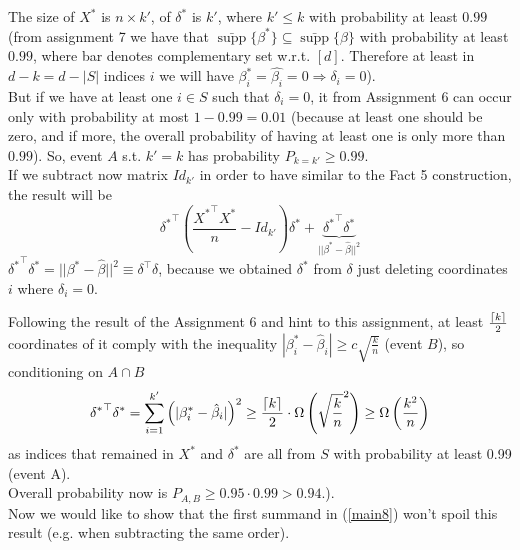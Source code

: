 \documentclass[]{article}
\DeclarePairedDelimiter\ceil{\lceil}{\rceil}
\DeclareMathOperator\supp{supp}
\begin{document}
The size of $X^*$ is $n\times k'$, of $\delta^*$ is $k'$, where $k'\le k$ with probability at least $0.99$ (from assignment 7  we have that $\bar{\supp}\{\beta^*\}\subseteq\bar{\supp}\{\hat{\beta}\}$ with probability at least $0.99$, where bar denotes complementary set w.r.t. $[d]$. Therefore at least in $d-k=d-|S|$ indices $i$ we will have $\beta_i^*=\hat{\beta_i}=0\Rightarrow \delta_i=0$).\\
But if we have at least one $i\in S$ such that $\delta_i=0$, it from Assignment 6 can occur only with probability at most $1-0.99=0.01$ (because at least one should be zero, and if more, the overall probability of having at least one is only more than $0.99$). So, event $A$ s.t. $k'=k$ has probability $P_{k=k'}\ge 0.99.$\\

If we subtract now matrix $Id_{k'}$ in order to have similar to the Fact 5 construction, the result will be
\begin{equation}
{\delta^*}^\top\left(\frac{{X^*}^\top X^*}{n} - Id_{k'}\right)\delta^*
+ \underbrace{{\delta^*}^\top\delta^*}_{||\beta^*-\hat{\beta}||^2}
\label{main8}
\end{equation}
${\delta^*}^\top\delta^*=||\beta^*-\hat{\beta}||^2\equiv \delta^\top \delta$, because we obtained $\delta^*$ from $\delta$ just deleting coordinates $i$ where $\delta_i=0$.

Following the result of the Assignment 6 and hint to this assignment, at least $\frac{\ceil{k}}{2}$ coordinates of it comply with the inequality $|\beta_i^*-\hat{\beta}_i|\ge c\sqrt{\frac{k}{n}}$ (event $B$), so conditioning on $A\cap B$
$$
{\delta^*}^\top\delta^* 
= \sum_{i=1}^{k'} \left(|\beta_i^*-\hat{\beta}_i|\right)^2
\ge \frac{\ceil{k}}{2}\cdot\Omega\left(\sqrt{\frac{k}{n}}^2\right) \ge \Omega\left(\frac{k^2}{n}\right)
$$
as indices that remained in $X^*$ and $\delta^*$ are all from $S$ with probability at least 0.99 (event A).\\
Overall probability now is $P_{A,B}\ge0.95\cdot 0.99>0.94$.).\\
Now we would like to show that the first summand in (\ref{main8}) won't spoil this result (e.g. when subtracting the same order).
\end{document}
